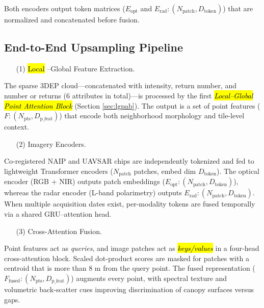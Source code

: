 \documentclass[remotesensing,article,accept,pdftex,moreauthors]{Definitions/mdpi}
\begin{document}
Both encoders output token matrices ($E_{\text{opt}}$ and $E_{\text{rad}}: (N_{\text{patch}}, D_{\text{token}})$) that are normalized and concatenated before fusion.

\newpage

\subsection{End-to-End Upsampling Pipeline}
\label{sec:pipeline}


\begin{enumerate}
\item[(1)] {\hl{Local}%
–Global Feature Extraction.}
\end{enumerate}

The sparse 3DEP cloud—concatenated with intensity, return number, and number or returns (6 attributes in total)—is processed by the first \emph{\hl{Local–Global Point Attention Block}} (Section \ref{sec:lgpab}). The output is a set of point features ($F: (N_{\text{pts}}, D_{\text{p\_feat}})$) that encode both neighborhood morphology and tile-level context.


\begin{enumerate}
\item[(2)] {Imagery Encoders.}
\end{enumerate}

Co-registered NAIP and UAVSAR chips are independently tokenized and fed to lightweight Transformer encoders ($N_{\text{patch}}$ patches, embed dim $D_{\text{token}}$). The optical encoder (RGB + NIR) outputs patch embeddings ($E_{\text{opt}}: (N_{\text{patch}}, D_{\text{token}})$), whereas the radar encoder (L-band polarimetry) outputs $E_{\text{rad}}: (N_{\text{patch}}, D_{\text{token}})$. When multiple acquisition dates exist, per-modality tokens are fused temporally via a shared GRU–attention head.

\begin{enumerate}
\item[(3)] {Cross-Attention Fusion.}
\end{enumerate}

Point features act as \emph{queries}, and image patches act as \emph{\hl{keys/values}} %
in a four-head cross-attention block.  
Scaled dot-product scores are masked for patches with a centroid that is more than 8 m from the query point. The fused representation ($F_{\text{fused}}: (N_{\text{pts}}, D_{\text{p\_feat}})$) augments every point, with spectral texture and volumetric back-scatter cues improving discrimination of canopy surfaces versus gaps.
\end{document}
